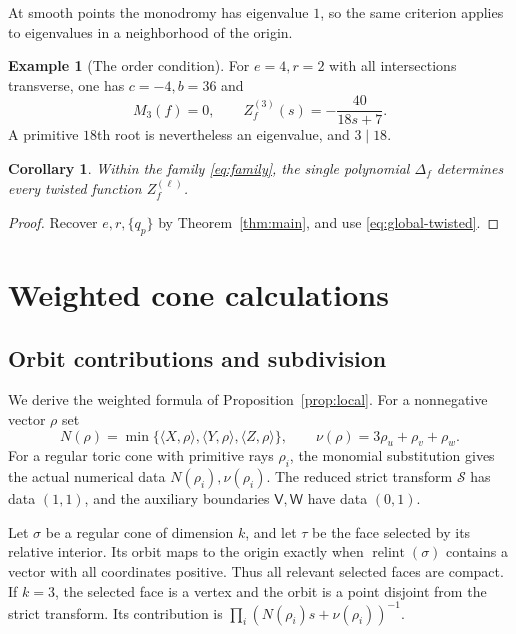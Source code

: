 \documentclass[11pt]{article}
\numberwithin{equation}{section}
\newtheorem{corollary}[theorem]{Corollary}
\theoremstyle{definition}
\newtheorem{example}[theorem]{Example}
\theoremstyle{remark}
\DeclareMathOperator{\relint}{relint}
\begin{document}
At smooth points the monodromy has eigenvalue $1$, so the
same criterion applies to eigenvalues in a neighborhood
of the origin.

\begin{example}[The order condition]\label{ex:twisted-order}
For $e=4,r=2$ with all intersections transverse, one has
$c=-4,b=36$ and
\[
 M_3(f)=0,\qquad Z_f^{(3)}(s)=-\frac{40}{18s+7}.
\]
A primitive $18$th root is nevertheless an eigenvalue, and
$3\mid18$.
\end{example}

\begin{corollary}\label{cor:twisted-recovery}
Within the family \eqref{eq:family}, the single polynomial
$\Delta_f$ determines every twisted function $Z_f^{(\ell)}$.
\end{corollary}

\begin{proof}
Recover $e,r,\{q_p\}$ by Theorem~\ref{thm:main}, and use
\eqref{eq:global-twisted}.
\end{proof}

\appendix
\section{Weighted cone calculations}\label{app:cones}

\subsection{Orbit contributions and subdivision}\label{app:subdivision}

We derive the weighted formula of Proposition~\ref{prop:local}.
For a nonnegative vector $\rho$ set
\[
 N(\rho)=\min\{\langle X,\rho\rangle,\langle Y,\rho\rangle,
                      \langle Z,\rho\rangle\},\qquad
 \nu(\rho)=3\rho_u+\rho_v+\rho_w.
\]
For a regular toric cone with primitive rays $\rho_i$,
the monomial substitution gives the actual numerical data
$N(\rho_i),\nu(\rho_i)$. The reduced strict transform
$\mathcal S$ has data $(1,1)$, and the auxiliary boundaries
$\mathsf V,\mathsf W$ have data $(0,1)$.

Let $\sigma$ be a regular cone of dimension $k$, and let $\tau$
be the face selected by its relative interior. Its orbit maps
to the origin exactly when $\relint(\sigma)$ contains a vector
with all coordinates positive. Thus all relevant selected
faces are compact. If $k=3$, the selected face is a vertex
and the orbit is a point disjoint from the strict transform.
Its contribution is $\prod_i(N(\rho_i)s+\nu(\rho_i))^{-1}$.
\end{document}
